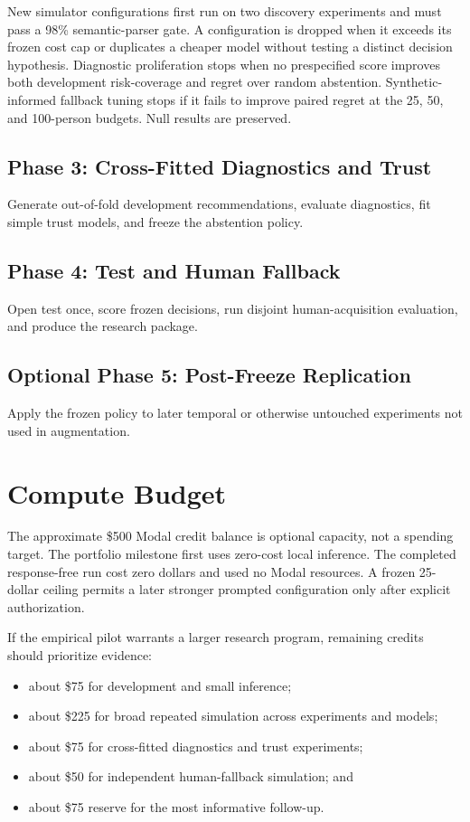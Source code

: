 \documentclass[11pt]{article}
\begin{document}
New simulator configurations first run on two discovery experiments and must pass a 98\% semantic-parser gate. A configuration is dropped when it exceeds its frozen cost cap or duplicates a cheaper model without testing a distinct decision hypothesis. Diagnostic proliferation stops when no prespecified score improves both development risk-coverage and regret over random abstention. Synthetic-informed fallback tuning stops if it fails to improve paired regret at the 25, 50, and 100-person budgets. Null results are preserved.

\subsection*{Phase 3: Cross-Fitted Diagnostics and Trust}

Generate out-of-fold development recommendations, evaluate diagnostics, fit simple trust models, and freeze the abstention policy.

\subsection*{Phase 4: Test and Human Fallback}

Open test once, score frozen decisions, run disjoint human-acquisition evaluation, and produce the research package.

\subsection*{Optional Phase 5: Post-Freeze Replication}

Apply the frozen policy to later temporal or otherwise untouched experiments not used in augmentation.

\section{Compute Budget}

The approximate \$500 Modal credit balance is optional capacity, not a spending target. The portfolio milestone first uses zero-cost local inference. The completed response-free run cost zero dollars and used no Modal resources. A frozen 25-dollar ceiling permits a later stronger prompted configuration only after explicit authorization.

If the empirical pilot warrants a larger research program, remaining credits should prioritize evidence:

\begin{itemize}
\item about \$75 for development and small inference;
\item about \$225 for broad repeated simulation across experiments and models;
\item about \$75 for cross-fitted diagnostics and trust experiments;
\item about \$50 for independent human-fallback simulation; and
\item about \$75 reserve for the most informative follow-up.
\end{itemize}
\end{document}

